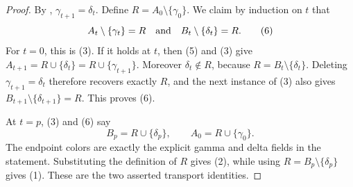 \begin{proof}
By ,
\(\gamma_{t+1}=\delta_t\).  Define
\(R=A_0\setminus\{\gamma_0\}\).  We claim by induction on \(t\) that
\[
 A_t\setminus\{\gamma_t\}=R
 \quad\hbox{and}\quad
 B_t\setminus\{\delta_t\}=R.                                  \tag{6}
\]
For \(t=0\), this is (3).  If it holds at \(t\), then (5) and (3) give
\(A_{t+1}=R\cup\{\delta_t\}=R\cup\{\gamma_{t+1}\}\).
Moreover \(\delta_t\notin R\), because
\(R=B_t\setminus\{\delta_t\}\).  Deleting
\(\gamma_{t+1}=\delta_t\) therefore recovers exactly \(R\), and the
next instance of (3) also gives
\(B_{t+1}\setminus\{\delta_{t+1}\}=R\).  This proves (6).

At \(t=p\), (3) and (6) say
\[
 B_p=R\cup\{\delta_p\},\qquad
 A_0=R\cup\{\gamma_0\}.
\]
The endpoint colors are exactly the explicit gamma and delta fields in
the statement.  Substituting the definition of \(R\) gives (2), while
using \(R=B_p\setminus\{\delta_p\}\) gives (1).  These are the two
asserted transport identities.
\end{proof}
